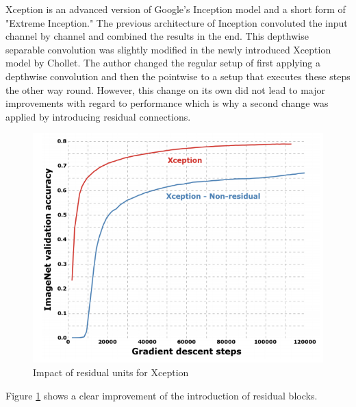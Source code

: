 Xception is an advanced version of Google's Inception model and a short form of "Extreme Inception." The previous architecture of Inception convoluted the input channel by channel and combined the results in the end. This depthwise separable convolution was slightly modified in the newly introduced Xception model by Chollet\cite{chollet2017xception}. The author changed the regular setup of first applying a depthwise convolution and then the pointwise to a setup that executes these steps the other way round. However, this change on its own did not lead to major improvements with regard to performance which is why a second change was applied by introducing residual connections\cite{chollet2017xception}.
\begin{figure}[ht]
  \centering
  \includegraphics[width=\linewidth]{figures/xception_residuals.png}
  \caption{Impact of residual units for Xception}
  \label{xception_residuals}
\end{figure}

Figure \ref{xception_residuals} shows a clear improvement of the introduction of residual blocks.

